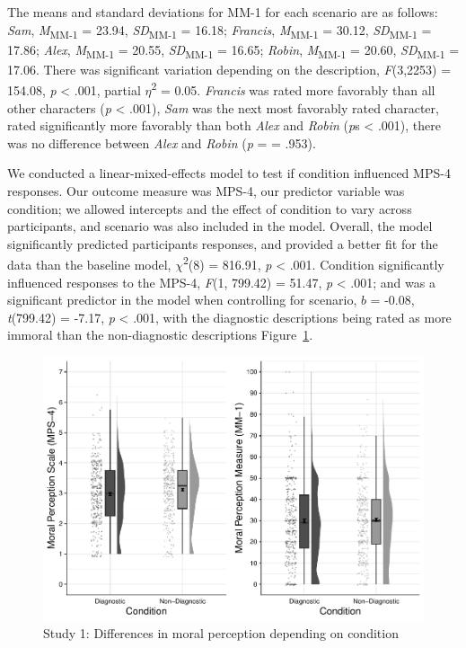 \documentclass[
  man,floatsintext]{apa6}
\begin{document}
The means and standard deviations for MM-1 for each scenario are as follows:
\emph{Sam},
\emph{M}\textsubscript{MM-1} = 23.94, \emph{SD}\textsubscript{MM-1} = 16.18;
\emph{Francis},
\emph{M}\textsubscript{MM-1} = 30.12, \emph{SD}\textsubscript{MM-1} = 17.86;
\emph{Alex},
\emph{M}\textsubscript{MM-1} = 20.55, \emph{SD}\textsubscript{MM-1} = 16.65;
\emph{Robin},
\emph{M}\textsubscript{MM-1} = 20.60, \emph{SD}\textsubscript{MM-1} = 17.06. There was significant variation depending on the description, \emph{F}(3,2253) = 154.08, \emph{p} \textless{} .001, partial \(\eta\)\textsuperscript{2} = 0.05. \emph{Francis} was rated more favorably than all other characters (\emph{p} \textless{} .001), \emph{Sam} was the next most favorably rated character, rated significantly more favorably than both \emph{Alex} and \emph{Robin} (\emph{p}s \textless{} .001), there was no difference between \emph{Alex} and \emph{Robin} (\emph{p} = = .953).

We conducted a linear-mixed-effects model to test if condition influenced MPS-4 responses. Our outcome measure was MPS-4, our predictor variable was condition; we allowed intercepts and the effect of condition to vary across participants, and scenario was also included in the model.
Overall, the model significantly predicted participants responses, and provided a better fit for the data than the baseline model, \(\chi\)\textsuperscript{2}(8) = 816.91, \emph{p} \textless{} .001. Condition significantly influenced responses to the MPS-4, \emph{F}(1, 799.42) = 51.47, \emph{p} \textless{} .001; and was a significant predictor in the model when controlling for scenario, \(b\) = -0.08, \emph{t}(799.42) = -7.17, \emph{p} \textless{} .001, with the diagnostic descriptions being rated as more immoral than the non-diagnostic descriptions Figure~\ref{fig:S1bothconditionplot}.

\begin{figure}
\centering
\includegraphics{moral_dilution_in_chunks_files/figure-latex/S1bothconditionplot-1.pdf}
\caption{\label{fig:S1bothconditionplot}Study 1: Differences in moral perception depending on condition}
\end{figure}
\end{document}
